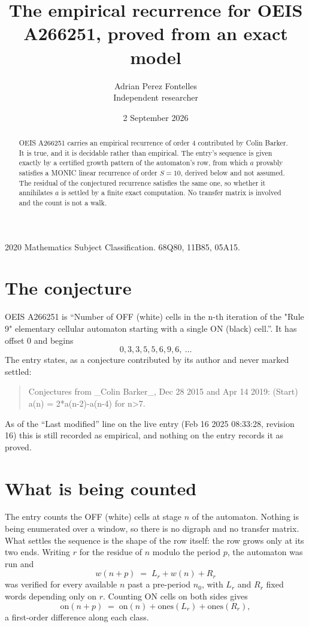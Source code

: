 \documentclass[11pt,a4paper]{article}
\title{The empirical recurrence for OEIS A266251, proved from an exact model}
\author{Adrian Perez Fontelles\\ \small Independent researcher}
\date{2 September 2026}
\theoremstyle{plain}
\theoremstyle{definition}
\begin{document}
\maketitle

\begin{abstract}
OEIS A266251 carries an empirical recurrence of order $4$ contributed by Colin Barker. It is true, and it is
decidable rather than empirical. The entry's sequence is given exactly by a certified growth pattern of the automaton's row, from
which $a$ provably satisfies a MONIC linear recurrence of order $S=10$, derived below and not
assumed. The residual of the conjectured recurrence satisfies the same one, so whether it
annihilates $a$ is settled by a finite exact computation. No transfer matrix is involved and
the count is not a walk.
\end{abstract}

\noindent\small 2020 Mathematics Subject Classification. 68Q80, 11B85, 05A15.\normalsize

\section{The conjecture}

OEIS A266251 is ``Number of OFF (white) cells in the n-th iteration of the "Rule 9" elementary cellular automaton starting with a single ON (black) cell.''. It has offset $0$ and begins
\[
0, 3, 3, 5, 5, 6, 9, 6,\ \dots
\]
The entry states, as a conjecture contributed by its author and never marked settled:
\begin{quote}
Conjectures from \_Colin Barker\_, Dec 28 2015 and Apr 14 2019: (Start) a(n) = 2*a(n-2)-a(n-4) for n>7.
\end{quote}
As of the ``Last modified'' line on the live entry (Feb 16 2025 08:33:28, revision 16)
this is still recorded as empirical, and nothing on the entry records it as proved.

\section{What is being counted}

The entry counts the OFF (white) cells at stage $n$ of the automaton. Nothing is being enumerated over a window, so there is
no digraph and no transfer matrix. What settles the sequence is the shape of the row itself:
the row grows only at its two ends. Writing
$r$ for the residue of $n$ modulo the period $p$, the automaton was run and
\[
w(n+p)\;=\;L_r + w(n) + R_r
\]
was verified for every available $n$ past a
pre-period $n_0$, with $L_r$ and $R_r$ fixed words depending only on $r$. Counting ON cells on
both sides gives
\[
\mathrm{on}(n+p)\;=\;\mathrm{on}(n)+\mathrm{ones}(L_r)+\mathrm{ones}(R_r),
\]
a first-order difference along each class.
\end{document}
